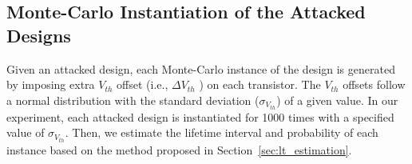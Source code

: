 \subsection{Monte-Carlo Instantiation of the Attacked Designs}
\label{sec:ins:mc_ins}
\begin{comment}
Given an attacked design, each Monte-Carlo instance of the design is generated by imposing extra $V_{th}$ offset (i.e., $\Delta V_{th}$ ) on each transistor. The $V_{th}$ offsets follow a normal distribution with the standard deviation ($\sigma_{V_{th}}$) of a given value (usually 10mV$\sim$25mV~\cite{han2011statistical}\cite{schlunder2017influence}). In our experiment, each attacked design is instantiated for 1000 times with a specified value of $\sigma_{V_{th}}$. Then, we estimate the lifetime interval and probability of each instance based on the method proposed in Section~\ref{sec:lt_estimation}. 
\end{comment}
Given an attacked design, each Monte-Carlo instance of the design is generated by imposing extra $V_{th}$ offset (i.e., $\Delta V_{th}$ ) on each transistor. The $V_{th}$ offsets follow a normal distribution with the standard deviation ($\sigma_{V_{th}}$) of a given value. In our experiment, each attacked design is instantiated for 1000 times with a specified value of $\sigma_{V_{th}}$. Then, we estimate the lifetime interval and probability of each instance based on the method proposed in Section~\ref{sec:lt_estimation}. 


